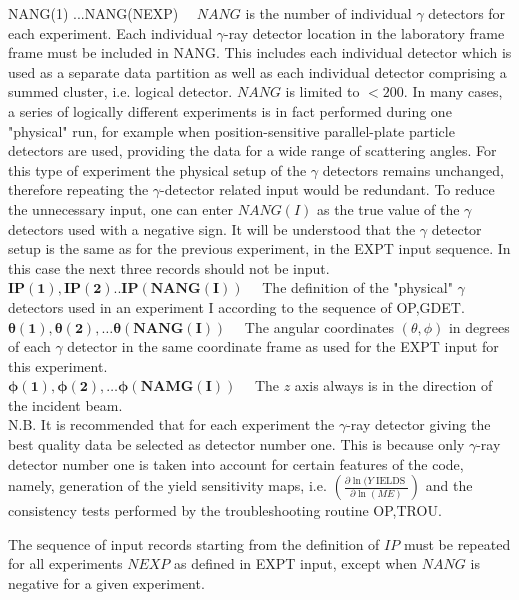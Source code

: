 \documentclass[10pt]{article}
\begin{document}
NANG(1) ...NANG(NEXP) $\quad N A N G$ is the number of individual $\gamma$ detectors for each experiment. Each individual $\gamma$-ray detector location in the laboratory frame frame must be included in NANG. This includes each individual detector which is used as a separate data partition as well as each individual detector comprising a summed cluster, i.e. logical detector. $N A N G$ is limited to $<200$. In many cases, a series of logically different experiments is in fact performed during one "physical" run, for example when position-sensitive parallel-plate particle detectors are used, providing the data for a wide range of scattering angles. For this type of experiment the physical setup of the $\gamma$ detectors remains unchanged, therefore repeating the $\gamma$-detector related input would be redundant. To reduce the unnecessary input, one can enter $N A N G(I)$ as the true value of the $\gamma$ detectors used with a negative sign. It will be understood that the $\gamma$ detector setup is the same as for the previous experiment, in the EXPT input sequence. In this case the next three records should not be input.\\
$\mathbf{I P}(\mathbf{1}), \mathbf{I P}(\mathbf{2}) . . \mathbf{I P}(\mathbf{N A N G}(\mathbf{I})) \quad$ The definition of the "physical" $\gamma$ detectors used in an experiment I according to the sequence of OP,GDET.\\
$\boldsymbol{\theta}(\mathbf{1}), \boldsymbol{\theta}(\mathbf{2}), \ldots \boldsymbol{\theta}(\mathbf{N A N G}(\mathbf{I})) \quad$ The angular coordinates $(\theta, \phi)$ in degrees of each $\gamma$ detector in the same coordinate frame as used for the EXPT input for this experiment.\\
$\boldsymbol{\phi}(\mathbf{1}), \boldsymbol{\phi}(\mathbf{2}), \ldots \boldsymbol{\phi}(\mathbf{N A M G}(\mathbf{I})) \quad$ The $z$ axis always is in the direction of the incident beam.\\
N.B. It is recommended that for each experiment the $\gamma$-ray detector giving the best quality data be selected as detector number one. This is because only $\gamma$-ray detector number one is taken into account for certain features of the code, namely, generation of the yield sensitivity maps, i.e. $\left(\frac{\partial \ln (Y \operatorname{IELDS}}{\partial \ln (M E)}\right)$ and the consistency tests performed by the troubleshooting routine OP,TROU.

The sequence of input records starting from the definition of $I P$ must be repeated for all experiments $N E X P$ as defined in EXPT input, except when $N A N G$ is negative for a given experiment.
\end{document}
